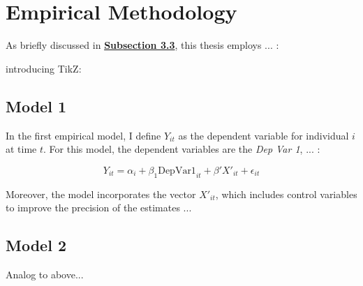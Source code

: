 \onehalfspacing
\section{Empirical Methodology}\label{sec:methodology}
\vspace{-0.3cm}
As briefly discussed in \textbf{\hyperref[sec:dependent]{Subsection 3.3}}, this thesis employs ... :

introducing TikZ:



\subsection{Model 1}\label{sec:model1}
\vspace{-0.3cm}
\justifying
In the first empirical model, I define $Y_{it}$ as the dependent variable for individual $i$ at time $t$. For this model, the dependent variables are the \textit{Dep Var 1}, ... :

\vspace{-0.3cm}
\begin{equation}
Y_{it} = \alpha_i + \beta_1\text{DepVar1}_{it} + \beta'X'_{it} + \epsilon_{it}
\tag{1}
\end{equation}

\noindent
Moreover, the model incorporates the vector $X'_{it}$, which includes control variables to improve the precision of the estimates ... 


\subsection{Model 2}\label{sec:model2}
\vspace{-0.3cm}
\justifying
Analog to above...




